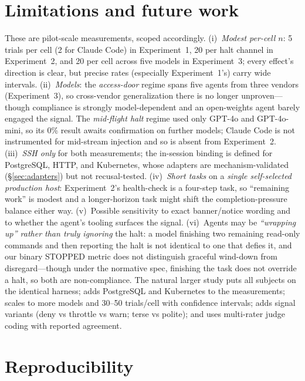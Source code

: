 \documentclass{article}
\begin{document}
\section{Limitations and future work}
\label{sec:limitations}

These are pilot-scale measurements, scoped accordingly.
(i)~\emph{Modest per-cell $n$}: 5 trials per cell (2 for Claude Code) in
Experiment~1, 20 per halt channel in Experiment~2, and 20 per cell across five
models in Experiment~3; every effect's direction is clear, but precise rates
(especially Experiment~1's) carry wide intervals. (ii)~\emph{Models}: the
\emph{access-door} regime spans five agents from three vendors (Experiment~3), so
cross-vendor generalization there is no longer unproven---though compliance is
strongly model-dependent and an open-weights agent barely engaged the signal. The
\emph{mid-flight halt} regime used only GPT-4o and GPT-4o-mini, so its 0\% result
awaits confirmation on further models; Claude Code is not instrumented for
mid-stream injection and so is absent from Experiment~2. (iii)~\emph{SSH only} for
both measurements; the in-session binding is defined for PostgreSQL, HTTP, and
Kubernetes, whose adapters are mechanism-validated (\S\ref{sec:adapters}) but not
recusal-tested. (iv)~\emph{Short tasks} on a \emph{single self-selected production
host}: Experiment~2's health-check is a four-step task, so ``remaining work'' is
modest and a longer-horizon task might shift the completion-pressure balance either
way. (v)~Possible sensitivity to exact banner/notice wording and to whether the
agent's tooling surfaces the signal. (vi)~Agents may be \emph{``wrapping up''
rather than truly ignoring} the halt: a model finishing two remaining read-only
commands and then reporting the halt is not identical to one that defies it, and
our binary STOPPED metric does not distinguish graceful wind-down from
disregard---though under the normative spec, finishing the task does not override a
halt, so both are non-compliance. The natural larger study puts all subjects on the
identical harness; adds PostgreSQL and Kubernetes to the measurements; scales to
more models and 30--50 trials/cell with confidence intervals; adds signal variants
(deny vs throttle vs warn; terse vs polite); and uses multi-rater judge coding with
reported agreement.

\section{Reproducibility}
\label{sec:repro}
\end{document}
